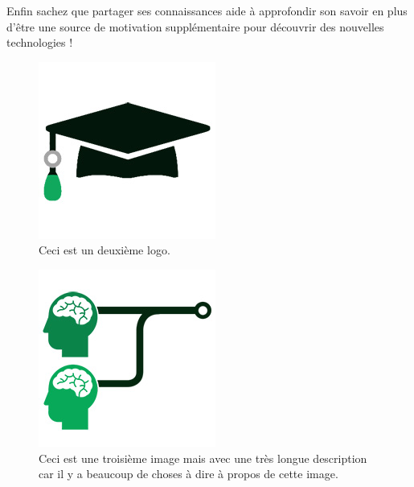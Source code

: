 \documentclass[a4paper,11pt]{article}
\begin{document}
Enfin sachez que partager ses connaissances aide à approfondir son savoir en plus d'être une source de motivation supplémentaire pour découvrir des nouvelles technologies !  


\begin{figure}
\includegraphics{image2.jpg}
\caption{Ceci est un deuxième logo.}
\end{figure}

\begin{figure}
\includegraphics{image3.jpg}
\caption[Logo avec des cerveaux]{Ceci est une troisième image mais avec une très longue description car il y a beaucoup de choses à dire à propos de cette image.}
\end{figure}
\end{document}
